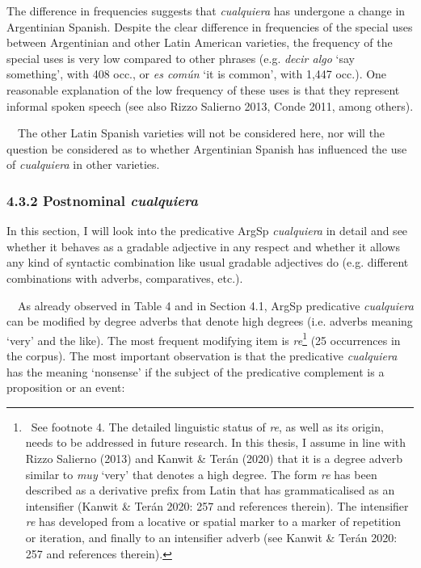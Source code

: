 \begin{styleStandard}
The difference in frequencies suggests that \textit{cualquiera} has undergone a change in Argentinian Spanish. Despite the clear difference in frequencies of the special uses between Argentinian and other Latin American varieties, the frequency of the special uses is very low compared to other phrases (e.g. \textit{decir algo} ‘say something’, with 408 occ., or \textit{es común} ‘it is common’, with 1,447 occ.). One reasonable explanation of the low frequency of these uses is that they represent informal spoken speech (see also Rizzo Salierno 2013, Conde 2011, among others). 
\end{styleStandard}

\begin{styleStandard}
\ \ The other Latin Spanish varieties will not be considered here, nor will the question be considered as to whether Argentinian Spanish has influenced the use of \textit{cualquiera} in other varieties. 
\end{styleStandard}

\subsubsection[4.3.2 Postnominal cualquiera]{\textbf{4.3.2 }\textbf{Postnominal }\textbf{\textit{cualquiera}}}
\begin{styleStandard}
In this section, I will look into the predicative ArgSp \textit{cualquiera} in detail and see whether it behaves as a gradable adjective in any respect and whether it allows any kind of syntactic combination like usual gradable adjectives do (e.g. different combinations with adverbs, comparatives, etc.). 
\end{styleStandard}

\begin{styleStandard}
\ \ As already observed in Table 4 and in Section 4.1, ArgSp predicative \textit{cualquiera} can be modified by degree adverbs that denote high degrees (i.e. adverbs meaning ‘very’ and the like). The most frequent modifying item is \textit{re}\footnote{\ \textrm{See footnote 4. The detailed linguistic status of }\textrm{\textit{re}}\textrm{, as well as its origin, needs to be addressed in future research. In this thesis, I assume in line with Rizzo Salierno (2013) and Kanwit \& Terán (2020) that it is a degree adverb similar to }\textrm{\textit{muy}}\textrm{ ‘very’ that denotes a high degree. The form }\textrm{\textit{re}}\textrm{ has been described as a derivative prefix from Latin that has grammaticalised as an intensifier (Kanwit \& Terán 2020: 257 and references therein). The intensifier }\textrm{\textit{re}}\textrm{ has developed from a locative or spatial marker to a marker of repetition or iteration, and finally to an intensifier adverb (see Kanwit \& Terán 2020: 257 and references therein).}} (25 occurrences in the corpus). The most important observation is that the predicative \textit{cualquiera} has the meaning ‘nonsense’ if the subject of the predicative complement is a proposition or an event: 
\end{styleStandard}


